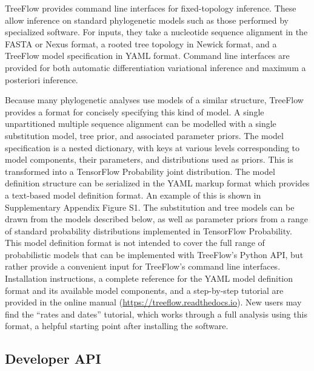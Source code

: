 TreeFlow provides command line interfaces for fixed-topology inference. These allow inference on standard phylogenetic models such as those performed by specialized software. For inputs, they take a nucleotide sequence alignment in the FASTA or Nexus format, a rooted tree topology in Newick format, and a TreeFlow model specification in YAML format. Command line interfaces are provided for both automatic differentiation variational inference and maximum a posteriori inference.

Because many phylogenetic analyses use models of a similar structure, TreeFlow provides a format for concisely specifying this kind of model. A single unpartitioned multiple sequence alignment can be modelled with a single substitution model, tree prior, and associated parameter priors. The model specification is a nested dictionary, with keys at various levels corresponding to model components, their parameters, and distributions used as priors. This is transformed into a TensorFlow Probability joint distribution. The model definition structure can be serialized in the YAML markup format which provides a text-based model definition format. An example of this is shown in Supplementary Appendix Figure S1. The substitution and tree models can be drawn from the models described below, as well as parameter priors from a range of standard probability distributions implemented in TensorFlow Probability. This model definition format is not intended to cover the full range of probabilistic models that can be implemented with TreeFlow's Python API, but rather provide a convenient input for TreeFlow's command line interfaces. Installation instructions, a complete reference for the YAML model definition format and its available model components, and a step-by-step tutorial are provided in the online manual (\url{https://treeflow.readthedocs.io}). New users may find the ``rates and dates'' tutorial, which works through a full analysis using this format, a helpful starting point after installing the software.

\subsection{Developer API}

